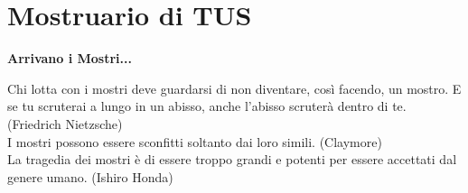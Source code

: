%
\section{Mostruario di TUS}

\textbf{Arrivano i Mostri...}

\begin{tcolorbox}[enhanced,arc=5pt,boxrule=0.3pt]{Chi lotta con i mostri deve guardarsi di non diventare, così facendo, un mostro. E se tu scruterai a lungo in un abisso, anche l'abisso scruterà dentro di te. (Friedrich Nietzsche)\\
		
I mostri possono essere sconfitti soltanto dai loro simili. (Claymore)\\

La tragedia dei mostri è di essere troppo grandi e potenti per essere accettati dal genere umano. (Ishiro Honda)
}\end{tcolorbox}\medskip

